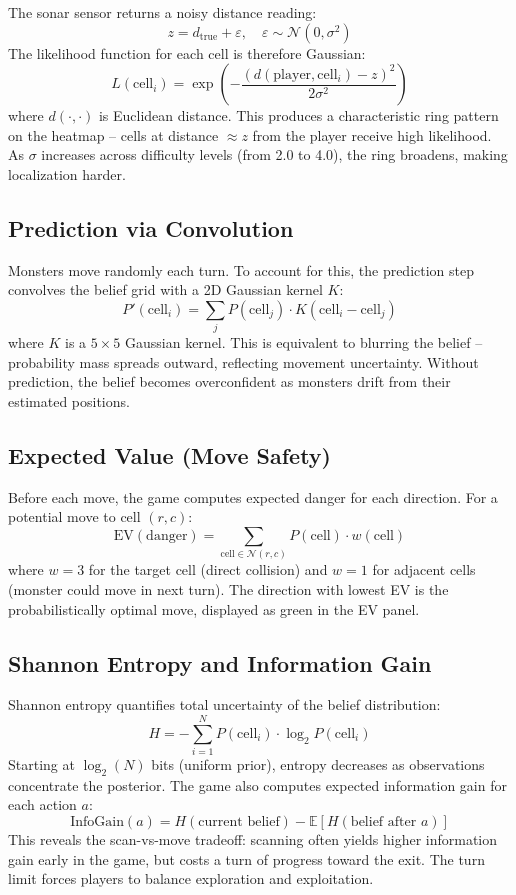 \documentclass[11pt]{article}
\begin{document}
The sonar sensor returns a noisy distance reading:
\[
z = d_{\text{true}} + \varepsilon, \quad \varepsilon \sim \mathcal{N}(0, \sigma^2)
\]
The likelihood function for each cell is therefore Gaussian:
\[
L(\text{cell}_i) = \exp\!\left(-\frac{(d(\text{player}, \text{cell}_i) - z)^2}{2\sigma^2}\right)
\]
where $d(\cdot, \cdot)$ is Euclidean distance. This produces a characteristic ring pattern on the heatmap -- cells at distance $\approx z$ from the player receive high likelihood. As $\sigma$ increases across difficulty levels (from 2.0 to 4.0), the ring broadens, making localization harder.

\subsection{Prediction via Convolution}

Monsters move randomly each turn. To account for this, the prediction step convolves the belief grid with a 2D Gaussian kernel $K$:
\[
P'(\text{cell}_i) = \sum_{j} P(\text{cell}_j) \cdot K(\text{cell}_i - \text{cell}_j)
\]
where $K$ is a $5 \times 5$ Gaussian kernel. This is equivalent to blurring the belief -- probability mass spreads outward, reflecting movement uncertainty. Without prediction, the belief becomes overconfident as monsters drift from their estimated positions.

\subsection{Expected Value (Move Safety)}

Before each move, the game computes expected danger for each direction. For a potential move to cell $(r, c)$:
\[
\text{EV}(\text{danger}) = \sum_{\text{cell} \in \mathcal{N}(r,c)} P(\text{cell}) \cdot w(\text{cell})
\]
where $w = 3$ for the target cell (direct collision) and $w = 1$ for adjacent cells (monster could move in next turn). The direction with lowest EV is the probabilistically optimal move, displayed as green in the EV panel.

\subsection{Shannon Entropy and Information Gain}

Shannon entropy quantifies total uncertainty of the belief distribution:
\[
H = -\sum_{i=1}^{N} P(\text{cell}_i) \cdot \log_2 P(\text{cell}_i)
\]
Starting at $\log_2(N)$ bits (uniform prior), entropy decreases as observations concentrate the posterior. The game also computes expected information gain for each action $a$:
\[
\text{InfoGain}(a) = H(\text{current belief}) - \mathbb{E}[H(\text{belief after } a)]
\]
This reveals the scan-vs-move tradeoff: scanning often yields higher information gain early in the game, but costs a turn of progress toward the exit. The turn limit forces players to balance exploration and exploitation.
\end{document}
